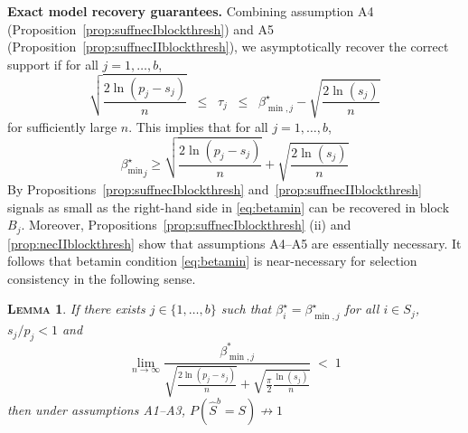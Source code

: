 \documentclass[aos]{imsart}
\theoremstyle{plain}
\newtheorem{lem}[thm]{\textsc{Lemma}}
\begin{document}
\noindent\textbf{Exact model recovery guarantees.} 
Combining assumption A4 (Proposition~\ref{prop:suffnecIblockthresh}) and A5 (Proposition~\ref{prop:suffnecIIblockthresh}),
we asymptotically recover the correct support if for all $j=1,\ldots,b$,
\begin{equation*}
  \sqrt{\frac{2\ln(p_j-s_j)}{n}}\;\;\leq\;\;\tau_j\;\;\leq\;\;\beta_{\min,j}^{\star}-\sqrt{\frac{2\ln(s_j)}{n}}
\end{equation*}
for sufficiently large $n$. This implies
that for all $j=1,\ldots,b$,
\begin{equation}\label{eq:betamin}
    {\beta_{\min}^{\star}}_j \geq \sqrt{\frac{2\ln(p_j-s_j)}{n}} + \sqrt{\frac{2\ln(s_j)}{n}}
\end{equation}
By Propositions~\ref{prop:suffnecIblockthresh} and~\ref{prop:suffnecIIblockthresh} signals as small as the right-hand side in \eqref{eq:betamin} can be recovered in block $B_j$. Moreover, Propositions~\ref{prop:suffnecIblockthresh} (ii) and \ref{prop:necIIblockthresh} show that assumptions A4--A5 are essentially necessary. It follows that betamin condition \eqref{eq:betamin} is near-necessary for selection consistency in the following sense.
\begin{lem}\label{lem:necbetaminblockthresh}
    If there exists $j\in\{1,\ldots,b\}$ such that $\beta^{\star}_i=\beta_{\min,j}^{\star}$ for all $i \in S_j$, $s_j/p_j<1$ and
    \begin{equation}\label{eq:necbetaminblockthresh}
      \lim_{n\to \infty}\frac{\beta_{\min,j}^*}{\sqrt{\tfrac{2\ln(p_j-s_j)}{n}}+\sqrt{\tfrac{\pi}{2}\tfrac{\ln(s_j)}{n}}}\;<\; 1  
    \end{equation}
then under assumptions A1--A3,\;  $P(\hat{S}^{b} = S)\not \to 1$
\end{lem}



\bigskip
\end{document}
